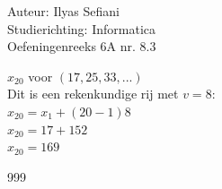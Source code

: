 \documentclass[a4paper]{article}
\begin{document}
\noindent \large Auteur: Ilyas Sefiani \\
\noindent \large Studierichting: Informatica\\
\noindent \large Oefeningenreeks 6A nr. 8.3\\

\medskip

\normalsize

$x_{20}$ voor $(17,25,33,...)$\\

Dit is een rekenkundige rij met $v=8$:\\

$x_{20}= x_1 + (20-1)8$\\

$x_{20}= 17+152$\\

$x_{20}= 169$\\


\begin{thebibliography}{999}
\end{thebibliography}
\end{document}
